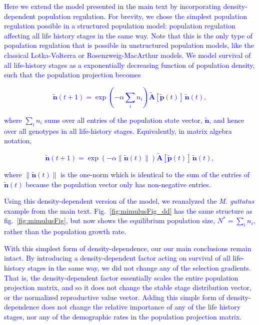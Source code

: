 \documentclass[11pt]{article}
\def\mbf#1{\mathbf{#1}}
\begin{document}
\textcolor{blue}{Here we extend the model presented in the main text by incorporating density-dependent population regulation. For brevity, we chose the simplest population regulation possible in a structured population model: population regulation affecting all life history stages in the same way. Note that this is the only type of population regulation that is possible in unstructured population models, like the classical Lotka-Volterra or Rosenzweig-MacArthur models. We model survival of all life-history stages as a exponentially decreasing function of population density, such that the population projection becomes
\begin{linenomath*}
\begin{equation}
	\tilde{\mbf{n}}(t + 1) = \exp\left(-\alpha \sum_i n_i \right) \tilde{\mbf{A}}[\tilde{\mbf{p}}(t)] \, \tilde{\mbf{n}}(t),
\end{equation}
\end{linenomath*}
where $\sum_i n_i$ sums over all entries of the population state vector, $\tilde{\mbf{n}}$, and hence over all genotypes in all life-history stages. Equivalently, in matrix algebra notation,
\begin{linenomath*}
\begin{equation}
	\tilde{\mbf{n}}(t + 1) = \exp\left(-\alpha \| \tilde{\mbf{n}}(t) \|\right) \tilde{\mbf{A}}[\tilde{\mbf{p}}(t)] \, \tilde{\mbf{n}}(t),
\end{equation}
\end{linenomath*}
where $\| \tilde{\mbf{n}}(t) \|$ is the one-norm which is identical to the sum of the entries of $\tilde{\mbf{n}}(t)$ because the population vector only has non-negative entries. }

\textcolor{blue}{Using this density-dependent version of the model, we reanalyzed the {\itshape M. guttatus} example from the main text. Fig.~\ref{fig:mimulusFig_dd} has the same structure as fig.~\ref{fig:mimulusFig}, but now shows the equilibrium population size, $N^{\ast} = \sum_i n_i $, rather than the population growth rate. }

\textcolor{blue}{With this simplest form of density-dependence, our our main conclusions remain intact. By introducing a density-dependent factor acting on survival of all life-history stages in the same way, we did not change any of the selection gradients. That is, the density-dependent factor essentially scales the entire population projection matrix, and so it does not change the stable stage distribution vector, or the normalized reproductive value vector. Adding this simple form of density-dependence does not change the relative importance of any of the life history stages, nor any of the demographic rates in the population projection matrix. }
\end{document}
